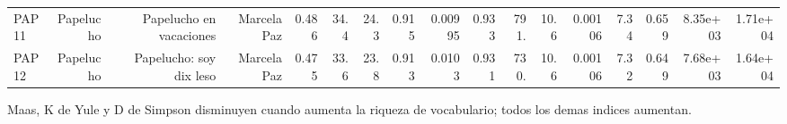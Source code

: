 \begin{table}[htbp]
\begin{tabular}{lrrrrrrrrrrrrrrrr}
PAP11 & Papelucho & Papelucho en vacaciones & Marcela Paz & 0.486 & 34.4 & 24.3 & 0.915 & 0.00995 & 0.933 & 791. & 10.6 & 0.00106 & 7.34 & 0.659 & 8.35e+03 & 1.71e+04 \\
PAP12 & Papelucho & Papelucho: soy dix leso & Marcela Paz & 0.475 & 33.6 & 23.8 & 0.913 & 0.0103 & 0.931 & 730. & 10.6 & 0.00106 & 7.32 & 0.649 & 7.68e+03 & 1.64e+04 \\
\bottomrule
\end{tabular}
\vspace{0.5em}
\begin{minipage}{\linewidth}\footnotesize Maas, K de Yule y D de Simpson disminuyen cuando aumenta la riqueza de vocabulario; todos los demas indices aumentan.\end{minipage}
\end{table}

